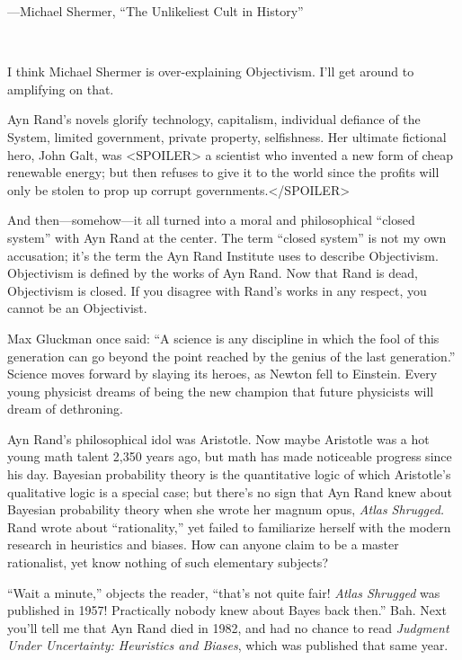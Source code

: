 {\raggedleft
 {}---Michael Shermer, ``The Unlikeliest Cult in
History''
\par}


\bigskip

{
 ~}

{
 I think Michael Shermer is over-explaining Objectivism.
I'll get around to amplifying on that.}

{
 Ayn Rand's novels glorify technology, capitalism,
individual defiance of the System, limited government, private
property, selfishness. Her ultimate fictional hero, John Galt, was
{\textless}SPOILER{\textgreater} a scientist who invented a new form of
cheap renewable energy; but then refuses to give it to the world since
the profits will only be stolen to prop up corrupt
governments.{\textless}/SPOILER{\textgreater}}

{
 And then---somehow---it all turned into a moral and philosophical
``closed system'' with Ayn Rand at
the center. The term ``closed
system'' is not my own accusation;
it's the term the Ayn Rand Institute uses to describe
Objectivism. Objectivism is defined by the works of Ayn Rand. Now that
Rand is dead, Objectivism is closed. If you disagree with
Rand's works in any respect, you cannot be an
Objectivist.}

{
 Max Gluckman once said: ``A science is any
discipline in which the fool of this generation can go beyond the point
reached by the genius of the last generation.''
Science moves forward by slaying its heroes, as Newton fell to
Einstein. Every young physicist dreams of being the new champion that
future physicists will dream of dethroning.}

{
 Ayn Rand's philosophical idol was Aristotle. Now
maybe Aristotle was a hot young math talent 2,350 years ago, but math
has made noticeable progress since his day. Bayesian probability theory
is the quantitative logic of which Aristotle's
qualitative logic is a special case; but there's no
sign that Ayn Rand knew about Bayesian probability theory when she
wrote her magnum opus, \textit{Atlas Shrugged.} Rand wrote about
``rationality,'' yet failed to
familiarize herself with the modern research in heuristics and biases.
How can anyone claim to be a master rationalist, yet know nothing of
such elementary subjects?}

{
 ``Wait a minute,'' objects the
reader, ``that's not quite fair!
\textit{Atlas Shrugged} was published in 1957! Practically nobody knew
about Bayes back then.'' Bah. Next
you'll tell me that Ayn Rand died in 1982, and had no
chance to read \textit{Judgment Under Uncertainty: Heuristics and
Biases}, which was published that same year.}

